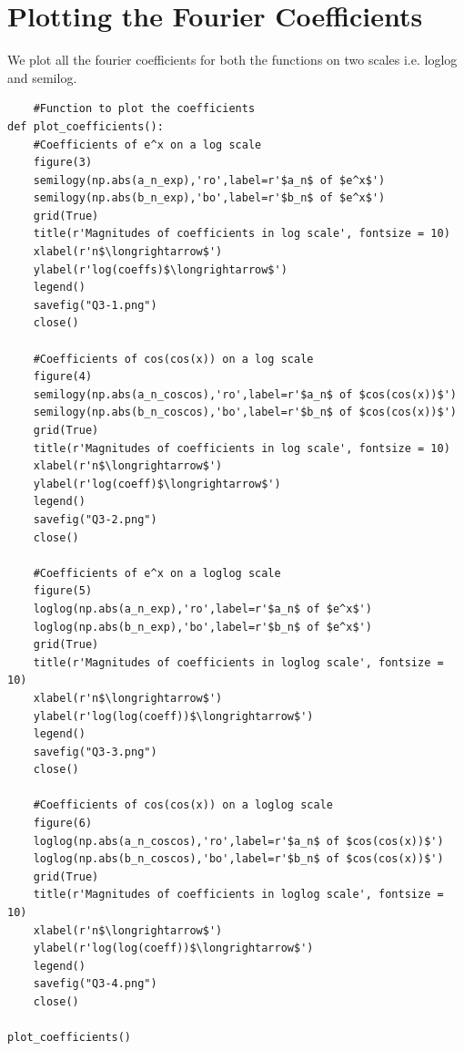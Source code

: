 \documentclass[11pt, a4paper]{article}
\begin{document}
\section{Plotting the Fourier Coefficients}
\par We plot all the fourier coefficients for both the functions on two scales i.e. loglog and semilog.
\begin{lstlisting}
    #Function to plot the coefficients
def plot_coefficients():
    #Coefficients of e^x on a log scale
    figure(3)
    semilogy(np.abs(a_n_exp),'ro',label=r'$a_n$ of $e^x$')
    semilogy(np.abs(b_n_exp),'bo',label=r'$b_n$ of $e^x$')    
    grid(True)
    title(r'Magnitudes of coefficients in log scale', fontsize = 10)
    xlabel(r'n$\longrightarrow$')
    ylabel(r'log(coeffs)$\longrightarrow$')
    legend()
    savefig("Q3-1.png")
    close()
    
    #Coefficients of cos(cos(x)) on a log scale
    figure(4)
    semilogy(np.abs(a_n_coscos),'ro',label=r'$a_n$ of $cos(cos(x))$')
    semilogy(np.abs(b_n_coscos),'bo',label=r'$b_n$ of $cos(cos(x))$')
    grid(True)
    title(r'Magnitudes of coefficients in log scale', fontsize = 10)
    xlabel(r'n$\longrightarrow$')
    ylabel(r'log(coeff)$\longrightarrow$')
    legend()
    savefig("Q3-2.png")
    close()
    
    #Coefficients of e^x on a loglog scale
    figure(5)
    loglog(np.abs(a_n_exp),'ro',label=r'$a_n$ of $e^x$')
    loglog(np.abs(b_n_exp),'bo',label=r'$b_n$ of $e^x$')
    grid(True)
    title(r'Magnitudes of coefficients in loglog scale', fontsize = 10)
    xlabel(r'n$\longrightarrow$')
    ylabel(r'log(log(coeff))$\longrightarrow$')
    legend()
    savefig("Q3-3.png")
    close()
    
    #Coefficients of cos(cos(x)) on a loglog scale
    figure(6)
    loglog(np.abs(a_n_coscos),'ro',label=r'$a_n$ of $cos(cos(x))$')
    loglog(np.abs(b_n_coscos),'bo',label=r'$b_n$ of $cos(cos(x))$')
    grid(True)
    title(r'Magnitudes of coefficients in loglog scale', fontsize = 10)
    xlabel(r'n$\longrightarrow$')
    ylabel(r'log(log(coeff))$\longrightarrow$')
    legend()
    savefig("Q3-4.png")
    close()

plot_coefficients()
\end{lstlisting}
\end{document}
